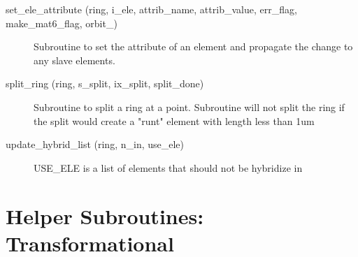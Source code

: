 \begin{description}
\item[set\_ele\_attribute (ring, i\_ele, attrib\_name, attrib\_value, 
err\_flag, make\_mat6\_flag, orbit\_)] \Newline
Subroutine to set the attribute of an element and propagate the change to any slave elements. 

\item[split\_ring (ring, s\_split, ix\_split, split\_done)] \Newline
Subroutine to split a ring at a point. Subroutine will not split the ring 
if the split would create a "runt" element with length less than 1um 

\item[update\_hybrid\_list (ring, n\_in, use\_ele)] \Newline
USE\_ELE is a list of elements that should not be hybridize in 

\end{description}

\section{Helper Subroutines: Transformational}
\label{r:trans}    

